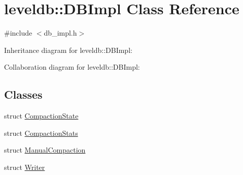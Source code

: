 \hypertarget{classleveldb_1_1_d_b_impl}{\section{leveldb\-:\-:D\-B\-Impl Class Reference}
\label{classleveldb_1_1_d_b_impl}
}


{\ttfamily \#include $<$db\-\_\-impl.\-h$>$}



Inheritance diagram for leveldb\-:\-:D\-B\-Impl\-:


Collaboration diagram for leveldb\-:\-:D\-B\-Impl\-:
\subsection*{Classes}
\begin{DoxyCompactItemize}
\item 
struct \hyperlink{structleveldb_1_1_d_b_impl_1_1_compaction_state}{Compaction\-State}
\item 
struct \hyperlink{structleveldb_1_1_d_b_impl_1_1_compaction_stats}{Compaction\-Stats}
\item 
struct \hyperlink{structleveldb_1_1_d_b_impl_1_1_manual_compaction}{Manual\-Compaction}
\item 
struct \hyperlink{structleveldb_1_1_d_b_impl_1_1_writer}{Writer}
\end{DoxyCompactItemize}

